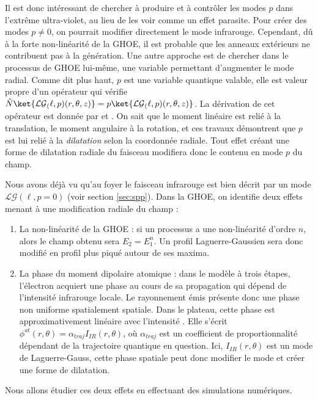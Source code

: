 Il est donc intéressant de chercher à produire et à contrôler les modes $p$ dans l'extrême ultra-violet, au lieu de les voir comme un effet parasite. Pour créer des modes $p\neq 0$, on pourrait modifier directement le mode infrarouge. Cependant, dû à la forte non-linéarité de la GHOE, il est probable que les anneaux extérieurs ne contribuent pas à la génération. Une autre approche est de chercher dans le processus de GHOE lui-même, une variable permettant d'augmenter le mode radial. Comme dit plus haut, $p$ est une variable quantique valable, elle est valeur propre d'un opérateur qui vérifie $\hat{N}\ket{\mathcal{LG}_(\ell,p)(r,\theta,z)} = p\ket{\mathcal{LG}_(\ell,p)(r,\theta,z)}$. La dérivation de cet opérateur est donnée par  et . On sait que le moment linéaire est relié à la translation, le moment angulaire à la rotation, et ces travaux démontrent que $p$ est lui relié à la \textit{dilatation} selon la coordonnée radiale. Tout effet créant une forme de dilatation radiale du faisceau modifiera donc le contenu en mode $p$ du champ.

Nous avons déjà vu qu'au foyer le faisceau infrarouge est bien décrit par un mode $\mathcal{LG}(\ell,p=0)$ (voir section \ref{sec:spp}). Dans la GHOE, on identifie deux effets menant à une modification radiale du champ : 
\begin{enumerate}
\item La non-linéarité de la GHOE : si un processus a une non-linéarité d'ordre $n$, alors le champ obtenu sera $E_2=E_1^n$. Un profil Laguerre-Gaussien sera donc modifié en profil plus piqué autour de ses maxima.

\item La phase du moment dipolaire atomique : dans le modèle à trois étapes, l'électron acquiert une phase au cours de sa propagation qui dépend de l'intensité infrarouge locale. Le rayonnement émis présente donc une phase non uniforme spatialement spatiale. Dans le plateau, cette phase est approximativement linéaire avec l'intensité . Elle s'écrit $\phi^{at}(r,\theta) = \alpha_{traj} I_{IR}(r,\theta)$, où $\alpha_{traj}$ est un coefficient de proportionnalité dépendant de la trajectoire quantique en question. Ici, $I_{IR}(r,\theta)$ est un mode de Laguerre-Gauss, cette phase spatiale peut donc modifier le mode et créer une forme de dilatation.
\end{enumerate}
Nous allons étudier ces deux effets en effectuant des simulations numériques.

